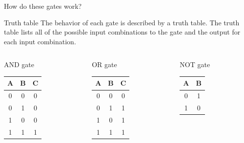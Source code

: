 \begin{frame}{How do these gates work?}
  \begin{block}{Truth table}
    The behavior of each gate is described by a \alert{truth table}.  The truth table lists all of the possible input combinations to the gate and the output for each input combination.
  \end{block}
  \vspace{5mm}
  \begin{columns}
    \begin{column}{3cm}
      \begin{center}
        AND gate\\
        \begin{tabular}{cc|c}
          \textbf{A} & \textbf{B} & \textbf{C} \\
          \hline
          0 & 0 & 0 \\
          0 & 1 & 0 \\
          1 & 0 & 0 \\
          1 & 1 & 1 \\
        \end{tabular}
      \end{center}
    \end{column}
    \begin{column}{3cm}
      \begin{center}
        OR gate\\
        \begin{tabular}{cc|c}
          \textbf{A} & \textbf{B} & \textbf{C} \\
          \hline
          0 & 0 & 0 \\
          0 & 1 & 1 \\
          1 & 0 & 1 \\
          1 & 1 & 1 \\
        \end{tabular}
      \end{center}
    \end{column}
    \begin{column}{3cm}
      \begin{center}
        NOT gate\\
        \begin{tabular}{c|c}
          \textbf{A} & \textbf{B} \\
          \hline
          0 & 1 \\
          1 & 0 \\
        \end{tabular}
      \end{center}
    \end{column}
  \end{columns}
\end{frame}

